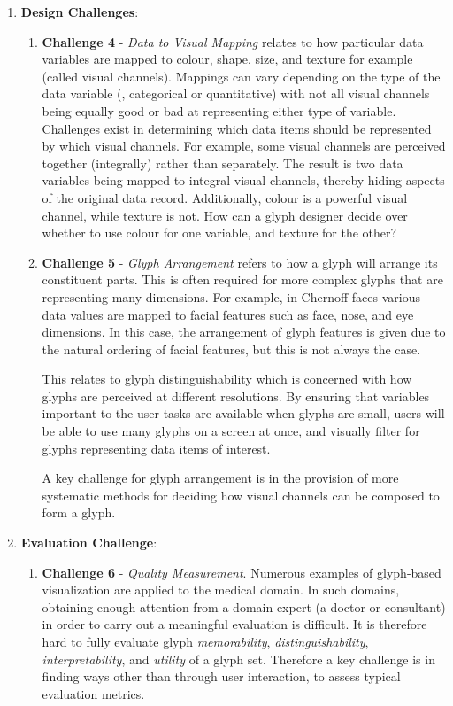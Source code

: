 \begin{enumerate}
\begin{enumerate}
	\end{enumerate}
\item \textbf{Design Challenges}:
	\begin{enumerate}
			\item \textbf{Challenge 4} -  \emph{Data to Visual Mapping} relates to how particular data variables are mapped to colour, shape, size, and texture for example (called visual channels).
			Mappings can vary depending on the type of the data variable (\eg, categorical or quantitative) with not all visual channels being equally good or bad at representing either type of variable.
			Challenges exist in determining which data items should be represented by which visual channels.
			For example, some visual channels are perceived together (integrally) rather than separately.
			The result is two data variables being mapped to integral visual channels, thereby hiding aspects of the original data record.
			Additionally, colour is a powerful visual channel, while texture is not.
			How can a glyph designer decide over whether to use colour for one variable, and texture for the other?
			
			\item \textbf{Challenge 5} - \emph{Glyph Arrangement} refers to how a glyph will arrange its constituent parts.
			This is often required for more complex glyphs that are representing many dimensions.
			For example, in Chernoff faces various data values are mapped to facial features such as face, nose, and eye dimensions.
			In this case, the arrangement of glyph features is given due to the natural ordering of facial features, but this is not always the case.
			
			This relates to glyph distinguishability which is concerned with how glyphs are perceived at different resolutions.
			By ensuring that variables important to the user tasks are available when glyphs are small, users will be able to use many glyphs on a screen at once, and visually filter for glyphs representing data items of interest.
			
			A key challenge for glyph arrangement is in the provision of more systematic methods for deciding how visual channels can be composed to form a glyph.
			
	\end{enumerate}
	
\item \textbf{Evaluation Challenge}:
\begin{enumerate}
	\item \textbf{Challenge 6} - \emph{Quality Measurement}. Numerous examples of glyph-based visualization are applied to the medical domain.
	In such domains, obtaining enough attention from a domain expert (a doctor or consultant) in order to carry out a meaningful evaluation is difficult.
	It is therefore hard to fully evaluate glyph \emph{memorability}, \emph{distinguishability}, \emph{interpretability}, and \emph{utility} of a glyph set.
	Therefore a key challenge is in finding ways other than through user interaction, to assess typical evaluation metrics.
\end{enumerate}

\end{enumerate}

